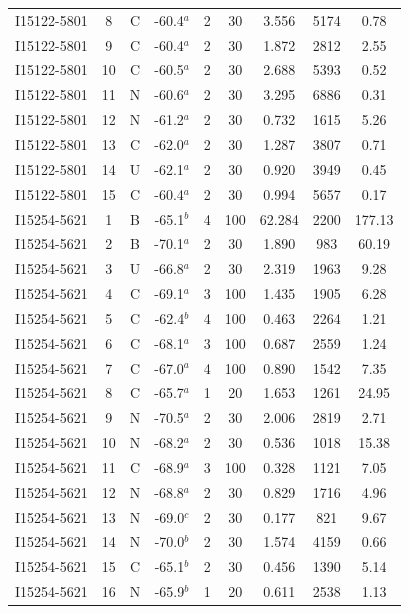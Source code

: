\begin{table}
\begin{tabular}{ccccccccc}
I15122-5801 & 8 & C & -60.4$^{a}$ & 2 & 30 & 3.556 & 5174 & 0.78 \\
I15122-5801 & 9 & C & -60.4$^{a}$ & 2 & 30 & 1.872 & 2812 & 2.55 \\
I15122-5801 & 10 & C & -60.5$^{a}$ & 2 & 30 & 2.688 & 5393 & 0.52 \\
I15122-5801 & 11 & N & -60.6$^{a}$ & 2 & 30 & 3.295 & 6886 & 0.31 \\
I15122-5801 & 12 & N & -61.2$^{a}$ & 2 & 30 & 0.732 & 1615 & 5.26 \\
I15122-5801 & 13 & C & -62.0$^{a}$ & 2 & 30 & 1.287 & 3807 & 0.71 \\
I15122-5801 & 14 & U & -62.1$^{a}$ & 2 & 30 & 0.920 & 3949 & 0.45 \\
I15122-5801 & 15 & C & -60.4$^{a}$ & 2 & 30 & 0.994 & 5657 & 0.17 \\
I15254-5621 & 1 & B & -65.1$^{b}$ & 4 & 100 & 62.284 & 2200 & 177.13 \\
I15254-5621 & 2 & B & -70.1$^{a}$ & 2 & 30 & 1.890 & 983 & 60.19 \\
I15254-5621 & 3 & U & -66.8$^{a}$ & 2 & 30 & 2.319 & 1963 & 9.28 \\
I15254-5621 & 4 & C & -69.1$^{a}$ & 3 & 100 & 1.435 & 1905 & 6.28 \\
I15254-5621 & 5 & C & -62.4$^{b}$ & 4 & 100 & 0.463 & 2264 & 1.21 \\
I15254-5621 & 6 & C & -68.1$^{a}$ & 3 & 100 & 0.687 & 2559 & 1.24 \\
I15254-5621 & 7 & C & -67.0$^{a}$ & 4 & 100 & 0.890 & 1542 & 7.35 \\
I15254-5621 & 8 & C & -65.7$^{a}$ & 1 & 20 & 1.653 & 1261 & 24.95 \\
I15254-5621 & 9 & N & -70.5$^{a}$ & 2 & 30 & 2.006 & 2819 & 2.71 \\
I15254-5621 & 10 & N & -68.2$^{a}$ & 2 & 30 & 0.536 & 1018 & 15.38 \\
I15254-5621 & 11 & C & -68.9$^{a}$ & 3 & 100 & 0.328 & 1121 & 7.05 \\
I15254-5621 & 12 & N & -68.8$^{a}$ & 2 & 30 & 0.829 & 1716 & 4.96 \\
I15254-5621 & 13 & N & -69.0$^{c}$ & 2 & 30 & 0.177 & 821 & 9.67 \\
I15254-5621 & 14 & N & -70.0$^{b}$ & 2 & 30 & 1.574 & 4159 & 0.66 \\
I15254-5621 & 15 & C & -65.1$^{b}$ & 2 & 30 & 0.456 & 1390 & 5.14 \\
I15254-5621 & 16 & N & -65.9$^{b}$ & 1 & 20 & 0.611 & 2538 & 1.13 \\

\end{tabular}
\end{table}
